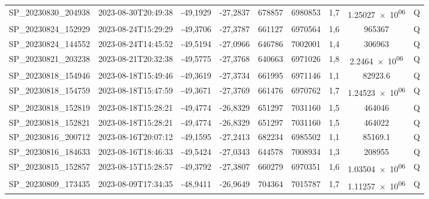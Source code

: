 \begin{center}
\begin{longtable}{ccccS[table-format=6.0]S[table-format=7.0]ccc}
\endlastfoot
SP\_20230830\_204938 & 2023-08-30T20:49:38 & -49,1929 & -27,2837 & 678857 & 6980853 & 1,7 & \num[round-precision=3,round-mode=figures,scientific-notation=true]{1.25027e+06} & Q \\
SP\_20230824\_152929 & 2023-08-24T15:29:29 & -49,3706 & -27,3787 & 661127 & 6970564 & 1,6 & \num[round-precision=3,round-mode=figures,scientific-notation=true]{965367} & Q \\
SP\_20230824\_144552 & 2023-08-24T14:45:52 & -49,5194 & -27,0966 & 646786 & 7002001 & 1,4 & \num[round-precision=3,round-mode=figures,scientific-notation=true]{306963} & Q \\
SP\_20230821\_203238 & 2023-08-21T20:32:38 & -49,5775 & -27,3768 & 640663 & 6971026 & 1,8 & \num[round-precision=3,round-mode=figures,scientific-notation=true]{2.2464e+06} & Q \\
SP\_20230818\_154946 & 2023-08-18T15:49:46 & -49,3619 & -27,3734 & 661995 & 6971146 & 1,1 & \num[round-precision=3,round-mode=figures,scientific-notation=true]{82923.6} & Q \\
SP\_20230818\_154759 & 2023-08-18T15:47:59 & -49,3671 & -27,3769 & 661476 & 6970762 & 1,7 & \num[round-precision=3,round-mode=figures,scientific-notation=true]{1.24523e+06} & Q \\
SP\_20230818\_152819 & 2023-08-18T15:28:21 & -49,4774 & -26,8329 & 651297 & 7031160 & 1,5 & \num[round-precision=3,round-mode=figures,scientific-notation=true]{464046} & Q \\
SP\_20230818\_152821 & 2023-08-18T15:28:21 & -49,4774 & -26,8329 & 651297 & 7031160 & 1,5 & \num[round-precision=3,round-mode=figures,scientific-notation=true]{464022} & Q \\
SP\_20230816\_200712 & 2023-08-16T20:07:12 & -49,1595 & -27,2413 & 682234 & 6985502 & 1,1 & \num[round-precision=3,round-mode=figures,scientific-notation=true]{85169.1} & Q \\
SP\_20230816\_184633 & 2023-08-16T18:46:33 & -49,5424 & -27,0343 & 644578 & 7008934 & 1,3 & \num[round-precision=3,round-mode=figures,scientific-notation=true]{208955} & Q \\
SP\_20230815\_152857 & 2023-08-15T15:28:57 & -49,3792 & -27,3807 & 660279 & 6970351 & 1,6 & \num[round-precision=3,round-mode=figures,scientific-notation=true]{1.03504e+06} & Q \\
SP\_20230809\_173435 & 2023-08-09T17:34:35 & -48,9411 & -26,9649 & 704364 & 7015787 & 1,7 & \num[round-precision=3,round-mode=figures,scientific-notation=true]{1.11257e+06} & Q \\

\end{longtable}
\end{center}
